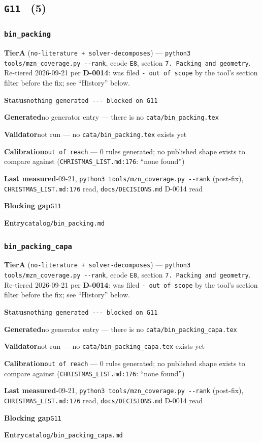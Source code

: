 \documentclass[10pt,a4paper]{article}
\newcommand{\entryfield}[2]{{\raggedright\textbf{#1}\quad #2\par}}
\begin{document}
\subsection*{\texttt{G11} \ \normalsize(5)}
\subsubsection*{\texttt{bin\_\allowbreak{}packing}}
\label{entry:bin-packing}
\entryfield{Tier}{\textbf{A} (\texttt{no-\allowbreak{}literature + solver-\allowbreak{}decomposes}) --- \texttt{python3 tools/\allowbreak{}mzn\_\allowbreak{}coverage.\allowbreak{}py -\allowbreak{}-\allowbreak{}rank}, ecode \texttt{E8}, section \texttt{7. Packing and geometry}. Re-tiered 2026-09-21 per \textbf{D-0014}: was filed \texttt{- out of scope} by the tool's section filter before the fix; see ``History'' below.}
\entryfield{Status}{\texttt{nothing generated -\allowbreak{}-\allowbreak{}-\allowbreak{} blocked on G11}}
\entryfield{Generated}{no generator entry --- there is no \texttt{cata/bin\_packing.tex}}
\entryfield{Validator}{not run --- no \texttt{cata/bin\_packing.tex} exists yet}
\entryfield{Calibration}{\texttt{out of reach} --- 0 rules generated; no published shape exists to compare against (\texttt{CHRISTMAS\_LIST.md:176}: ``none found'')}
\entryfield{Last measured}{2026-09-21, \texttt{python3 tools/\allowbreak{}mzn\_\allowbreak{}coverage.\allowbreak{}py -\allowbreak{}-\allowbreak{}rank} (post-fix), \texttt{CHRISTMAS\_LIST.md:176} read, \texttt{docs/DECISIONS.md} D-0014 read}
\entryfield{Blocking gap}{\texttt{G11}}
\entryfield{Entry}{\texttt{catalog/bin\_packing.md}}
\subsubsection*{\texttt{bin\_\allowbreak{}packing\_\allowbreak{}capa}}
\label{entry:bin-packing-capa}
\entryfield{Tier}{\textbf{A} (\texttt{no-\allowbreak{}literature + solver-\allowbreak{}decomposes}) --- \texttt{python3 tools/\allowbreak{}mzn\_\allowbreak{}coverage.\allowbreak{}py -\allowbreak{}-\allowbreak{}rank}, ecode \texttt{E8}, section \texttt{7. Packing and geometry}. Re-tiered 2026-09-21 per \textbf{D-0014}: was filed \texttt{- out of scope} by the tool's section filter before the fix; see ``History'' below.}
\entryfield{Status}{\texttt{nothing generated -\allowbreak{}-\allowbreak{}-\allowbreak{} blocked on G11}}
\entryfield{Generated}{no generator entry --- there is no \texttt{cata/\allowbreak{}bin\_\allowbreak{}packing\_\allowbreak{}capa.\allowbreak{}tex}}
\entryfield{Validator}{not run --- no \texttt{cata/\allowbreak{}bin\_\allowbreak{}packing\_\allowbreak{}capa.\allowbreak{}tex} exists yet}
\entryfield{Calibration}{\texttt{out of reach} --- 0 rules generated; no published shape exists to compare against (\texttt{CHRISTMAS\_LIST.md:176}: ``none found'')}
\entryfield{Last measured}{2026-09-21, \texttt{python3 tools/\allowbreak{}mzn\_\allowbreak{}coverage.\allowbreak{}py -\allowbreak{}-\allowbreak{}rank} (post-fix), \texttt{CHRISTMAS\_LIST.md:176} read, \texttt{docs/DECISIONS.md} D-0014 read}
\entryfield{Blocking gap}{\texttt{G11}}
\entryfield{Entry}{\texttt{catalog/bin\_packing\_capa.md}}
\end{document}
